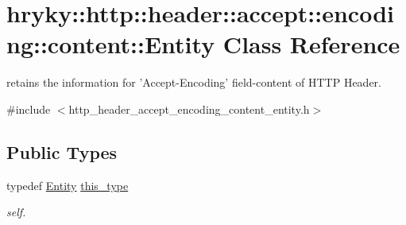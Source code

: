 \hypertarget{classhryky_1_1http_1_1header_1_1accept_1_1encoding_1_1content_1_1_entity}{\section{hryky\-:\-:http\-:\-:header\-:\-:accept\-:\-:encoding\-:\-:content\-:\-:Entity Class Reference}
\label{classhryky_1_1http_1_1header_1_1accept_1_1encoding_1_1content_1_1_entity}
}


retains the information for 'Accept-\/\-Encoding' field-\/content of H\-T\-T\-P Header.  




{\ttfamily \#include $<$http\-\_\-header\-\_\-accept\-\_\-encoding\-\_\-content\-\_\-entity.\-h$>$}

\subsection*{Public Types}
\begin{DoxyCompactItemize}
\item 
\hypertarget{classhryky_1_1http_1_1header_1_1accept_1_1encoding_1_1content_1_1_entity_a491c5790e2c6436117285524fd922a57}{typedef \hyperlink{classhryky_1_1http_1_1header_1_1accept_1_1encoding_1_1content_1_1_entity}{Entity} \hyperlink{classhryky_1_1http_1_1header_1_1accept_1_1encoding_1_1content_1_1_entity_a491c5790e2c6436117285524fd922a57}{this\-\_\-type}}\label{classhryky_1_1http_1_1header_1_1accept_1_1encoding_1_1content_1_1_entity_a491c5790e2c6436117285524fd922a57}

\begin{DoxyCompactList}\small\item\em self. \end{DoxyCompactList}\end{DoxyCompactItemize}

